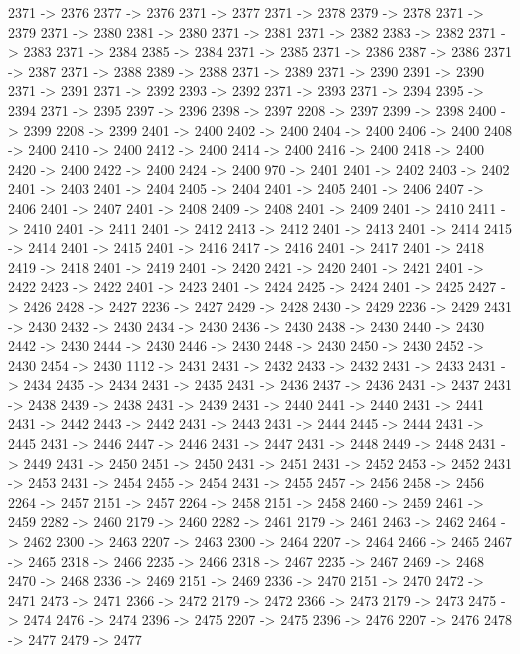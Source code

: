 {	2371 -> 2376
	2377 -> 2376
	2371 -> 2377
	2371 -> 2378
	2379 -> 2378
	2371 -> 2379
	2371 -> 2380
	2381 -> 2380
	2371 -> 2381
	2371 -> 2382
	2383 -> 2382
	2371 -> 2383
	2371 -> 2384
	2385 -> 2384
	2371 -> 2385
	2371 -> 2386
	2387 -> 2386
	2371 -> 2387
	2371 -> 2388
	2389 -> 2388
	2371 -> 2389
	2371 -> 2390
	2391 -> 2390
	2371 -> 2391
	2371 -> 2392
	2393 -> 2392
	2371 -> 2393
	2371 -> 2394
	2395 -> 2394
	2371 -> 2395
	2397 -> 2396
	2398 -> 2397
	2208 -> 2397
	2399 -> 2398
	2400 -> 2399
	2208 -> 2399
	2401 -> 2400
	2402 -> 2400
	2404 -> 2400
	2406 -> 2400
	2408 -> 2400
	2410 -> 2400
	2412 -> 2400
	2414 -> 2400
	2416 -> 2400
	2418 -> 2400
	2420 -> 2400
	2422 -> 2400
	2424 -> 2400
	970 -> 2401
	2401 -> 2402
	2403 -> 2402
	2401 -> 2403
	2401 -> 2404
	2405 -> 2404
	2401 -> 2405
	2401 -> 2406
	2407 -> 2406
	2401 -> 2407
	2401 -> 2408
	2409 -> 2408
	2401 -> 2409
	2401 -> 2410
	2411 -> 2410
	2401 -> 2411
	2401 -> 2412
	2413 -> 2412
	2401 -> 2413
	2401 -> 2414
	2415 -> 2414
	2401 -> 2415
	2401 -> 2416
	2417 -> 2416
	2401 -> 2417
	2401 -> 2418
	2419 -> 2418
	2401 -> 2419
	2401 -> 2420
	2421 -> 2420
	2401 -> 2421
	2401 -> 2422
	2423 -> 2422
	2401 -> 2423
	2401 -> 2424
	2425 -> 2424
	2401 -> 2425
	2427 -> 2426
	2428 -> 2427
	2236 -> 2427
	2429 -> 2428
	2430 -> 2429
	2236 -> 2429
	2431 -> 2430
	2432 -> 2430
	2434 -> 2430
	2436 -> 2430
	2438 -> 2430
	2440 -> 2430
	2442 -> 2430
	2444 -> 2430
	2446 -> 2430
	2448 -> 2430
	2450 -> 2430
	2452 -> 2430
	2454 -> 2430
	1112 -> 2431
	2431 -> 2432
	2433 -> 2432
	2431 -> 2433
	2431 -> 2434
	2435 -> 2434
	2431 -> 2435
	2431 -> 2436
	2437 -> 2436
	2431 -> 2437
	2431 -> 2438
	2439 -> 2438
	2431 -> 2439
	2431 -> 2440
	2441 -> 2440
	2431 -> 2441
	2431 -> 2442
	2443 -> 2442
	2431 -> 2443
	2431 -> 2444
	2445 -> 2444
	2431 -> 2445
	2431 -> 2446
	2447 -> 2446
	2431 -> 2447
	2431 -> 2448
	2449 -> 2448
	2431 -> 2449
	2431 -> 2450
	2451 -> 2450
	2431 -> 2451
	2431 -> 2452
	2453 -> 2452
	2431 -> 2453
	2431 -> 2454
	2455 -> 2454
	2431 -> 2455
	2457 -> 2456
	2458 -> 2456
	2264 -> 2457
	2151 -> 2457
	2264 -> 2458
	2151 -> 2458
	2460 -> 2459
	2461 -> 2459
	2282 -> 2460
	2179 -> 2460
	2282 -> 2461
	2179 -> 2461
	2463 -> 2462
	2464 -> 2462
	2300 -> 2463
	2207 -> 2463
	2300 -> 2464
	2207 -> 2464
	2466 -> 2465
	2467 -> 2465
	2318 -> 2466
	2235 -> 2466
	2318 -> 2467
	2235 -> 2467
	2469 -> 2468
	2470 -> 2468
	2336 -> 2469
	2151 -> 2469
	2336 -> 2470
	2151 -> 2470
	2472 -> 2471
	2473 -> 2471
	2366 -> 2472
	2179 -> 2472
	2366 -> 2473
	2179 -> 2473
	2475 -> 2474
	2476 -> 2474
	2396 -> 2475
	2207 -> 2475
	2396 -> 2476
	2207 -> 2476
	2478 -> 2477
	2479 -> 2477
}

